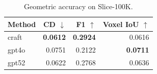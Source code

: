 \begin{table}[t]
\centering
\caption{Geometric accuracy on Slice-100K.}
\label{tab:geometric_slice100k}
\begin{tabular}{lrrr}
\toprule
Method & CD $\downarrow$ & F1 $\uparrow$ & Voxel IoU $\uparrow$ \\
\midrule
craft & \textbf{0.0612} & \textbf{0.2924} & 0.0616 \\
gpt4o & 0.0751 & 0.2122 & \textbf{0.0711} \\
gpt52 & 0.0622 & 0.2768 & 0.0636 \\
\bottomrule
\end{tabular}
\end{table}
